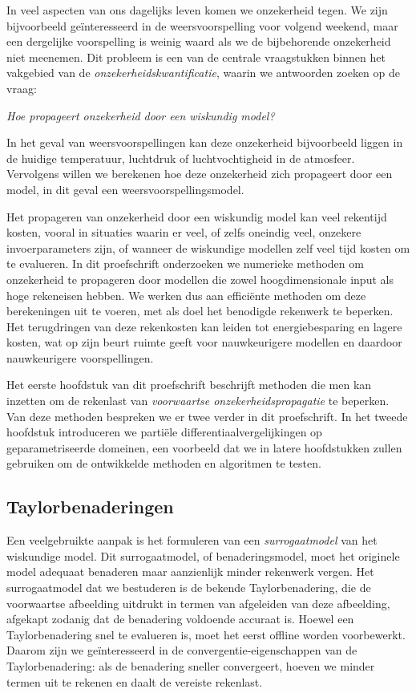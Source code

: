 In veel aspecten van ons dagelijks leven komen we onzekerheid tegen.
We zijn bijvoorbeeld geïnteresseerd in de weersvoorspelling voor volgend weekend, maar een dergelijke voorspelling is weinig waard als we de bijbehorende onzekerheid niet meenemen.
Dit probleem is een van de centrale vraagstukken binnen het vakgebied van de \emph{onzekerheidskwantificatie}, waarin we antwoorden zoeken op de vraag:

    \begin{center}
        \textit{Hoe propageert onzekerheid door een wiskundig model?}
    \end{center}

In het geval van weersvoorspellingen kan deze onzekerheid bijvoorbeeld liggen in de huidige temperatuur, luchtdruk of luchtvochtigheid in de atmosfeer.
Vervolgens willen we berekenen hoe deze onzekerheid zich propageert door een model, in dit geval een weersvoorspellingsmodel.

Het propageren van onzekerheid door een wiskundig model kan veel rekentijd kosten, vooral in situaties waarin er veel, of zelfs oneindig veel, onzekere invoerparameters zijn, of wanneer de wiskundige modellen zelf veel tijd kosten om te evalueren.
In dit proefschrift onderzoeken we numerieke methoden om onzekerheid te propageren door modellen die zowel hoogdimensionale input als hoge rekeneisen hebben.
We werken dus aan efficiënte methoden om deze berekeningen uit te voeren, met als doel het benodigde rekenwerk te beperken.
Het terugdringen van deze rekenkosten kan leiden tot energiebesparing en lagere kosten, wat op zijn beurt ruimte geeft voor nauwkeurigere modellen en daardoor nauwkeurigere voorspellingen.

Het eerste hoofdstuk van dit proefschrift beschrijft methoden die men kan inzetten om de rekenlast van \emph{voorwaartse onzekerheidspropagatie} te beperken.
Van deze methoden bespreken we er twee verder in dit proefschrift.
In het tweede hoofdstuk introduceren we partiële differentiaalvergelijkingen op geparametriseerde domeinen, een voorbeeld dat we in latere hoofdstukken zullen gebruiken om de ontwikkelde methoden en algoritmen te testen.

\subsection*{Taylorbenaderingen}\label{subsec:taylor-surrogates_nl}
Een veelgebruikte aanpak is het formuleren van een \emph{surrogaatmodel} van het wiskundige model.
Dit surrogaatmodel, of benaderingsmodel, moet het originele model adequaat benaderen maar aanzienlijk minder rekenwerk vergen.
Het surrogaatmodel dat we bestuderen is de bekende Taylorbenadering, die de voorwaartse afbeelding uitdrukt in termen van afgeleiden van deze afbeelding, afgekapt zodanig dat de benadering voldoende accuraat is.
Hoewel een Taylorbenadering snel te evalueren is, moet het eerst offline worden voorbewerkt.
Daarom zijn we geïnteresseerd in de convergentie-eigenschappen van de Taylorbenadering: als de benadering sneller convergeert, hoeven we minder termen uit te rekenen en daalt de vereiste rekenlast.

